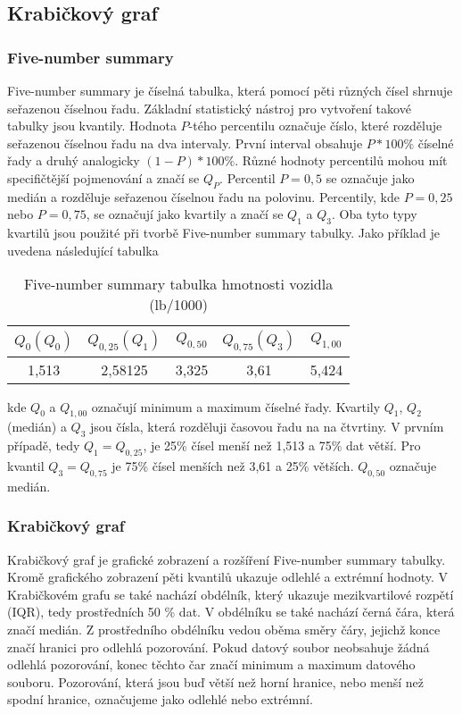 \subsection{Krabičkový graf}
\subsubsection{Five-number summary}
Five-number summary je číselná tabulka, která pomocí pěti různých čísel shrnuje seřazenou číselnou řadu. Základní statistický nástroj pro
vytvoření takové tabulky jsou kvantily. Hodnota $P$-tého percentilu označuje číslo, které rozděluje seřazenou číselnou řadu na dva intervaly. 
První interval obsahuje $P*100\%$ číselné řady a druhý analogicky $(1-P)*100\%$. Různé hodnoty percentilů mohou mít specifičtější pojmenování a značí se $Q_P$.
Percentil $P = 0,5$ se označuje jako medián a rozděluje seřazenou číselnou řadu na polovinu. Percentily, kde $P = 0,25$ nebo $P = 0,75$, se označují
jako kvartily a značí se $Q_{1}$ a $Q_{3}$. Oba tyto typy kvartilů jsou použité při tvorbě Five-number summary tabulky. Jako příklad je
uvedena následující tabulka

\begin{table}[H]
    \centering
    \begin{tabular}[t]{c|c|c|c|c}
        \hline
        $Q_{0} (Q_0)$ & $Q_{0,25} (Q_1) $ & $Q_{0,50}$ & $Q_{0,75} (Q_3)$ & $Q_{1,00}$\\
        \hline
        1,513 & 2,58125 & 3,325 & 3,61 & 5,424\\
        \hline
    \end{tabular}
    \caption{\label{tab:five-number_summary}Five-number summary tabulka hmotnosti vozidla (lb/1000)}
\end{table}

kde $Q_{0}$ a $Q_{1,00}$ označují minimum a maximum číselné řady. Kvartily $Q_{1}$, $Q_{2}$ (medián) a $Q_{3}$ jsou čísla, která rozděluji časovou řadu na na čtvrtiny. V prvním
případě, tedy $Q_1 = Q_{0,25}$, je 25\% čísel menší než 1,513 a 75\% dat větší. Pro kvantil $Q_3 = Q_{0,75}$ je 75\% čísel menších než 3,61 a 25\% větších. $Q_{0,50}$ označuje medián.

\subsubsection{Krabičkový graf}
Krabičkový graf je grafické zobrazení a rozšíření Five-number summary tabulky. Kromě grafického zobrazení 
pěti kvantilů  ukazuje odlehlé a extrémní hodnoty.
V Krabičkovém grafu se také nachází obdélník, který ukazuje mezikvartilové rozpětí (IQR), tedy prostředních 50 \% dat. V obdélníku se také nachází černá čára, která značí medián.
Z prostředního obdélníku vedou oběma směry čáry, jejichž konce značí hranici pro odlehlá pozorování. Pokud datový soubor neobsahuje žádná odlehlá pozorování, konec těchto čar
značí minimum a maximum datového souboru.
Pozorování, která jsou buď větší než horní hranice, nebo menší než spodní hranice, označujeme jako odlehlé nebo extrémní. 

